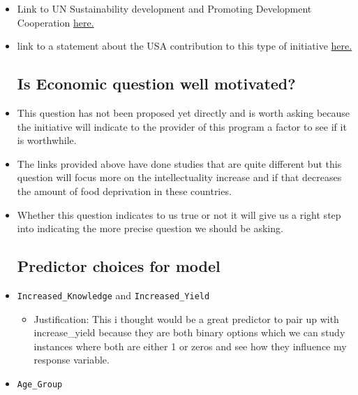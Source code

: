 \documentclass[
  letterpaper,
  DIV=11,
  numbers=noendperiod]{scrartcl}
\providecommand{\tightlist}{%
  \setlength{\itemsep}{0pt}\setlength{\parskip}{0pt}}\usepackage{longtable,booktabs,array}
\begin{document}
\begin{itemize}
\item
  Link to UN Sustainability development and Promoting Development
  Cooperation
  \href{www.un.org/en/ecosoc/docs/pdfs/fina_08-45773.pdf}{here.}
\item
  link to a statement about the USA contribution to this type of
  initiative
  \href{https://www.usaid.gov/news-information/press-releases/may-12-2022-usaid-launches-new-205-million-climate-change-and-environmental}{here.}

  \hypertarget{section}{%
  \subsection{}\label{section}}

  \hypertarget{is-economic-question-well-motivated}{%
  \subsection{Is Economic question well
  motivated?}\label{is-economic-question-well-motivated}}
\item
  This question has not been proposed yet directly and is worth asking
  because the initiative will indicate to the provider of this program a
  factor to see if it is worthwhile.
\item
  The links provided above have done studies that are quite different
  but this question will focus more on the intellectuality increase and
  if that decreases the amount of food deprivation in these countries.
\item
  Whether this question indicates to us true or not it will give us a
  right step into indicating the more precise question we should be
  asking.

  \hypertarget{predictor-choices-for-model}{%
  \subsection{Predictor choices for
  model}\label{predictor-choices-for-model}}
\item
  \texttt{Increased\_Knowledge} and \texttt{Increased\_Yield}

  \begin{itemize}
  \tightlist
  \item
    Justification: This i thought would be a great predictor to pair up
    with increase\_yield because they are both binary options which we
    can study instances where both are either 1 or zeros and see how
    they influence my response variable.
  \end{itemize}
\item
  \texttt{Age\_Group}


\end{itemize}
\end{document}
